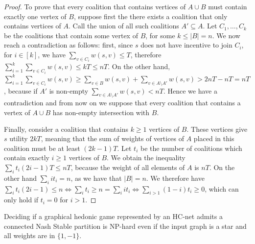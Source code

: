 \documentclass[letterpaper,USenglish,cleveref, autoref, thm-restate]{lipics-v2021}
\begin{document}
\begin{proof}
To prove that every coalition that contains vertices of $A\cup B$ must contain
exactly one vertex of $B$, suppose first the there exists a coalition that only
contains vertices of $A$. Call the union of all such coalitions $A'\subseteq
A$.  Let $C_1,\ldots, C_k$ be the coalitions that contain some vertex of $B$,
for some $k\le |B|=n$.  We now reach a contradiction as follows: first, since
$s$ does not have incentive to join $C_i$, for $i\in[k]$, we have $\sum_{v\in
C_i} w(s,v) \le T$, therefore $\sum_{i=1}^k\sum_{v\in C_i} w(s,v) \le kT \le
nT$. On the other hand, $\sum_{i=1}^k\sum_{v\in C_i} w(s,v) \ge \sum_{v\in B}
w(s,v) + \sum_{v\in A\setminus A'} w(s,v) > 2nT - nT = nT$, because if $A'$ is
non-empty $\sum_{v\in A\setminus A'} w(s,v) < nT$. Hence we have a
contradiction and from now on we suppose that every coalition that contains a
vertex of $A\cup B$ has non-empty intersection with $B$.

Finally, consider a coalition that contains $k\ge 1$ vertices of $B$.  These
vertices give $s$ utility $2kT$, meaning that the sum of weights of vertices of
$A$ placed in this coalition must be at least $(2k-1)T$. Let $t_i$ be the
number of coalitions which contain exactly $i\ge 1$ vertices of $B$. We obtain
the inequality $\sum_i t_i (2i-1)T \le nT$, because the weight of all elements
of $A$ is $nT$. On the other hand $\sum_i it_i = n$, as we have that $|B|=n$.
We therefore have $\sum_i t_i(2i-1) \le n \Leftrightarrow \sum_i t_i \ge n =
\sum_i it_i \Leftrightarrow \sum_{i>1} (1-i)t_i \ge 0$, which can only hold if
$t_i=0$ for $i>1$.  \end{proof}


\begin{theorem}\label{thm:paraNP2} Deciding if a graphical hedonic game
represented by an HC-net admits a connected Nash Stable partition is NP-hard
even if the input graph is a star and all weights are in $\{1,-1\}$.
\end{theorem}
\end{document}
